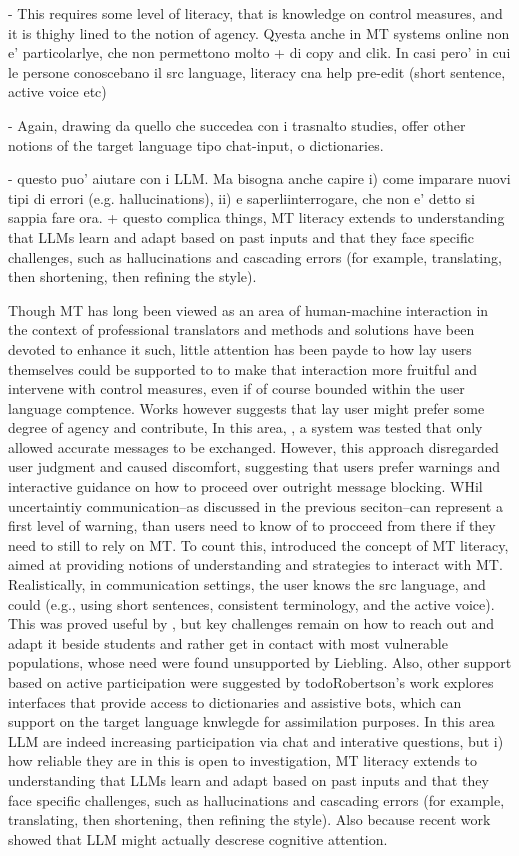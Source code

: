 - This requires some level of literacy, that is knowledge on control measures, and it is thighy lined to the notion of agency. Qyesta anche in MT systems online non e' particolarlye, che non permettono molto + di copy and clik. In casi pero' in cui le persone conoscebano il src language, literacy cna help pre-edit (short sentence, active voice etc)

- Again, drawing da quello che succedea con i trasnalto studies, offer other notions of the target language tipo chat-input, o dictionaries. 

- questo puo' aiutare con i LLM. Ma bisogna anche capire i) come imparare nuovi tipi di errori (e.g. hallucinations), ii) e saperliinterrogare, che non e' detto si sappia fare ora. + questo complica things, MT literacy extends to understanding that LLMs learn and adapt based on past inputs and that they face specific challenges, such as hallucinations and cascading errors (for example, translating, then shortening, then refining the style).


Though MT has long been viewed as an area of human-machine interaction in the context of professional translators and methods and solutions have been devoted to enhance it such, little attention has been payde to how lay users themselves could be supported to to make that interaction more fruitful and intervene with control measures, even if of course bounded within the user language comptence. 
Works however suggests that lay user might prefer some degree of agency and contribute,  
In this area,  , a system was tested that only allowed accurate messages to be exchanged. However, this approach disregarded user judgment and caused discomfort, suggesting that users prefer warnings and interactive guidance on how to proceed over outright message blocking.
WHil uncertaintiy communication--as discussed in the previous seciton--can represent a first level of warning, than users need to know of to procceed from there if they need to still to rely on MT. 
To count this, \citet{bowker2019towards} introduced the concept of MT literacy, aimed at providing notions of understanding and strategies to interact with MT. Realistically, in communication settings, the user knows the src language, and could (e.g., using short sentences, consistent terminology, and the active voice). This was proved useful by \citet{Bowker01092020}, but key challenges remain on how to reach out and adapt it beside students and rather get in contact with most vulnerable populations, whose need were found unsupported by Liebling. 
Also, other support based on active participation were suggested by todo{Robertson}'s work explores interfaces that provide access to dictionaries and assistive bots, which can support on the target language knwlegde for assimilation purposes. In this area LLM are indeed increasing participation via chat and interative questions, but i) how reliable they are in this is open to investigation,  MT literacy extends to understanding that LLMs learn and adapt based on past inputs and that they face specific challenges, such as hallucinations and cascading errors (for example, translating, then shortening, then refining the style). Also because recent work showed that LLM might actually descrese cognitive attention. 



